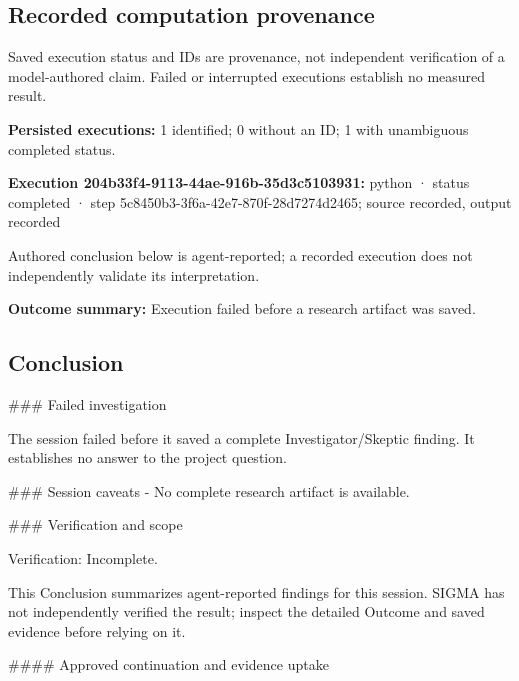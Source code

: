 \documentclass[11pt]{article}
\begin{document}
\subsection{Recorded computation provenance}
Saved execution status and IDs are provenance, not independent verification of a model-authored claim. Failed or interrupted executions establish no measured result.\par
\textbf{Persisted executions:} 1 identified; 0 without an ID; 1 with unambiguous completed status.\par
\textbf{Execution 204b33f4-9113-44ae-916b-35d3c5103931:} python · status completed · step 5c8450b3-3f6a-42e7-870f-28d7274d2465; source recorded, output recorded\par
Authored conclusion below is agent-reported; a recorded execution does not independently validate its interpretation.\par
\textbf{Outcome summary:} Execution failed before a research artifact was saved.\par
\subsection{Conclusion}
\#\#\# Failed investigation

The session failed before it saved a complete Investigator/Skeptic finding. It establishes no answer to the project question.

\#\#\# Session caveats
- No complete research artifact is available.

\#\#\# Verification and scope

Verification: Incomplete.

This Conclusion summarizes agent-reported findings for this session. SIGMA has not independently verified the result; inspect the detailed Outcome and saved evidence before relying on it.

\#\#\#\# Approved continuation and evidence uptake
\end{document}
